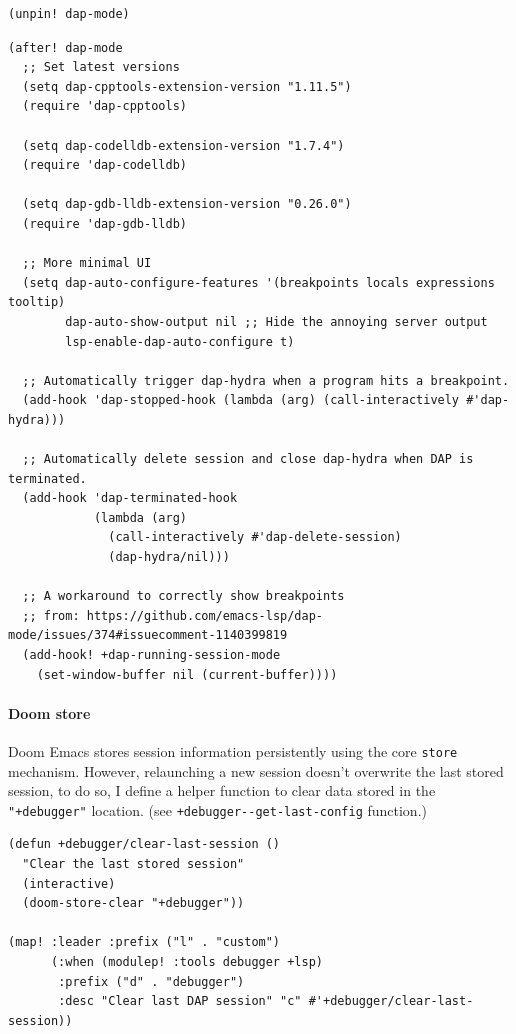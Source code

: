 \documentclass[11pt]{article}
\begin{document}
\begin{verbatim}
(unpin! dap-mode)
\end{verbatim}

\begin{verbatim}
(after! dap-mode
  ;; Set latest versions
  (setq dap-cpptools-extension-version "1.11.5")
  (require 'dap-cpptools)

  (setq dap-codelldb-extension-version "1.7.4")
  (require 'dap-codelldb)

  (setq dap-gdb-lldb-extension-version "0.26.0")
  (require 'dap-gdb-lldb)

  ;; More minimal UI
  (setq dap-auto-configure-features '(breakpoints locals expressions tooltip)
        dap-auto-show-output nil ;; Hide the annoying server output
        lsp-enable-dap-auto-configure t)

  ;; Automatically trigger dap-hydra when a program hits a breakpoint.
  (add-hook 'dap-stopped-hook (lambda (arg) (call-interactively #'dap-hydra)))

  ;; Automatically delete session and close dap-hydra when DAP is terminated.
  (add-hook 'dap-terminated-hook
            (lambda (arg)
              (call-interactively #'dap-delete-session)
              (dap-hydra/nil)))

  ;; A workaround to correctly show breakpoints
  ;; from: https://github.com/emacs-lsp/dap-mode/issues/374#issuecomment-1140399819
  (add-hook! +dap-running-session-mode
    (set-window-buffer nil (current-buffer))))
\end{verbatim}

\paragraph{Doom store}
\label{sec:orga2a9dbe}
Doom Emacs stores session information persistently using the core \texttt{store}
mechanism. However, relaunching a new session doesn't overwrite the last stored
session, to do so, I define a helper function to clear data stored in the
\texttt{"+debugger"} location. (see \texttt{+debugger-{}-get-last-config} function.)

\begin{verbatim}
(defun +debugger/clear-last-session ()
  "Clear the last stored session"
  (interactive)
  (doom-store-clear "+debugger"))

(map! :leader :prefix ("l" . "custom")
      (:when (modulep! :tools debugger +lsp)
       :prefix ("d" . "debugger")
       :desc "Clear last DAP session" "c" #'+debugger/clear-last-session))
\end{verbatim}
\end{document}
